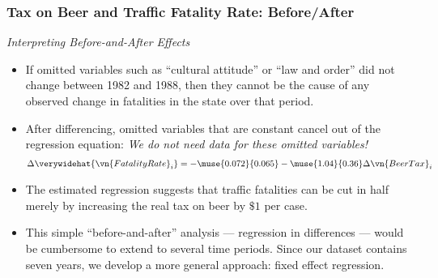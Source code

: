 \begin{frame}
\frametitle{Tax on Beer and Traffic Fatality Rate: Before/After}
\emph{Interpreting Before-and-After Effects} 
\begin{itemize}
\item If omitted variables such as ``cultural attitude'' or ``law and order'' did not change between 1982 and 1988, then they cannot be the cause of any observed change in fatalities in the state over that period.
\item After differencing, omitted variables that are constant cancel out of the regression equation: 
\emph{We do not need data for these omitted variables!}
\begin{align*}
\Delta\verywidehat{\vn{FatalityRate}_{i}}
  = -\muse{0.072}{0.065} 
  - \muse{1.04}{0.36} \Delta \vn{BeerTax}_{i}
\end{align*}
\item The estimated regression suggests that traffic fatalities can be cut in half merely by increasing the real tax on beer by $\$1$ per case.
\item This simple ``before-and-after'' analysis --- regression in differences --- would be cumbersome to extend to several time periods. Since our dataset contains seven years, we develop a more general approach: fixed effect regression.
\end{itemize}
\end{frame}
